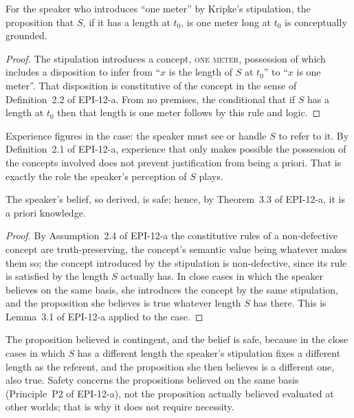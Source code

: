 \documentclass{situationist-preprint}
\begin{document}
\begin{proposition}\label{p:ground}
For the speaker who introduces \enquote{one meter} by Kripke's stipulation, the proposition that $S$, if it has a length at $t_0$, is one meter long at $t_0$ is conceptually grounded.
\end{proposition}

\begin{proof}
The stipulation introduces a concept, \textsc{one meter}, possession of which includes a disposition to infer from \enquote{$x$ is the length of $S$ at $t_0$} to \enquote{$x$ is one meter}. That disposition is constitutive of the concept in the sense of Definition~2.2 of EPI-12-a. From no premises, the conditional that if $S$ has a length at $t_0$ then that length is one meter follows by this rule and logic.
\end{proof}

Experience figures in the case: the speaker must see or handle $S$ to refer to it. By Definition~2.1 of EPI-12-a, experience that only makes possible the possession of the concepts involved does not prevent justification from being a priori. That is exactly the role the speaker's perception of $S$ plays.

\begin{proposition}\label{p:safe}
The speaker's belief, so derived, is safe; hence, by Theorem~3.3 of EPI-12-a, it is a priori knowledge.
\end{proposition}

\begin{proof}
By Assumption~2.4 of EPI-12-a the constitutive rules of a non-defective concept are truth-preserving, the concept's semantic value being whatever makes them so; the concept introduced by the stipulation is non-defective, since its rule is satisfied by the length $S$ actually has. In close cases in which the speaker believes on the same basis, she introduces the concept by the same stipulation, and the proposition she believes is true whatever length $S$ has there. This is Lemma~3.1 of EPI-12-a applied to the case.
\end{proof}

The proposition believed is contingent, and the belief is safe, because in the close cases in which $S$ has a different length the speaker's stipulation fixes a different length as the referent, and the proposition she then believes is a different one, also true. Safety concerns the propositions believed on the same basis (Principle~P2 of EPI-12-a), not the proposition actually believed evaluated at other worlds; that is why it does not require necessity.
\end{document}

